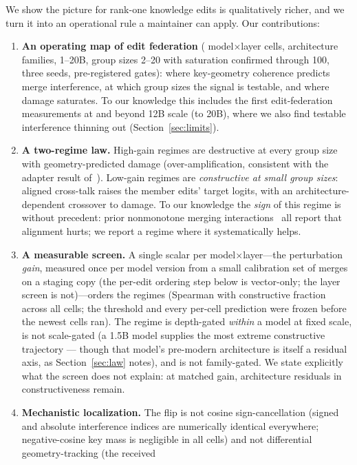 \documentclass[preprint,12pt]{elsarticle}
\begin{document}
We show the picture for rank-one knowledge edits is qualitatively richer, and we turn it
into an operational rule a maintainer can apply. Our contributions:
\begin{enumerate}
\item \textbf{An operating map of edit federation} (\nCells{} model$\times$layer cells,
\nFamilies{} architecture families, 1--20B, group sizes 2--20 with saturation confirmed
through 100, three seeds, pre-registered gates): where key-geometry coherence predicts merge interference, at which group sizes the
signal is testable, and where damage saturates. To our knowledge this includes the first
edit-federation measurements at and beyond 12B scale (to 20B), where we also find
testable interference thinning out (Section~\ref{sec:limits}).
\item \textbf{A two-regime law.} High-gain regimes are destructive at every group size with
geometry-predicted damage (over-amplification, consistent with the adapter result
of~\cite{mergeprobe2026}). Low-gain regimes are \emph{constructive at small group sizes}:
aligned cross-talk raises the member edits' target logits, with an architecture-dependent
crossover to damage. To our knowledge the \emph{sign} of this regime is without precedent:
prior nonmonotone merging interactions~\cite{forkmerge2023,mergeprobe2026} all report that
alignment hurts; we report a regime where it systematically helps.
\item \textbf{A measurable screen.} A single scalar per model$\times$layer---the
perturbation \emph{gain}, measured once per model version from a small calibration set
of merges on a staging copy (the per-edit ordering step below is vector-only; the layer
screen is not)---orders
the regimes (Spearman \ordSpearman{} with constructive fraction across all cells; the
threshold and every per-cell prediction were frozen before the newest cells ran). The
regime is depth-gated \emph{within} a model at fixed scale, is not scale-gated (a 1.5B model
supplies the most extreme constructive trajectory --- though that model's pre-modern
architecture is itself a residual axis, as Section~\ref{sec:law} notes), and is not
family-gated. We state explicitly
what the screen does not explain: at matched gain, architecture residuals in
constructiveness remain.
\item \textbf{Mechanistic localization.} The flip is not cosine sign-cancellation (signed
and absolute interference indices are numerically identical everywhere; negative-cosine key
mass is negligible in all cells) and not differential geometry-tracking (the received

\end{enumerate}
\end{document}
